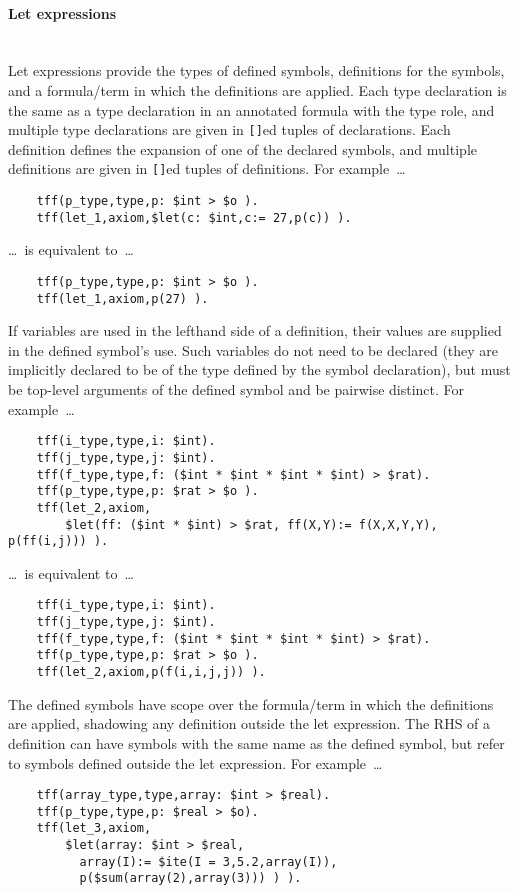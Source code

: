 \documentclass{easychair}
\begin{document}
\paragraph{Let expressions}~\\
Let expressions provide the types of defined symbols, definitions for the 
symbols, and a formula/term in which the definitions are applied. 
Each type declaration is the same as a type declaration in an annotated 
formula with the type role, and multiple type declarations are given in 
{\tt []}ed tuples of declarations. 
Each definition defines the expansion of one of the declared symbols, and 
multiple definitions are given in {\tt []}ed tuples of definitions. 
For example~\ldots
\begin{verbatim}
    tff(p_type,type,p: $int > $o ).
    tff(let_1,axiom,$let(c: $int,c:= 27,p(c)) ).
\end{verbatim}
\ldots~is equivalent to~\ldots
\begin{verbatim}
    tff(p_type,type,p: $int > $o ).
    tff(let_1,axiom,p(27) ).
\end{verbatim}
If variables are used in the lefthand side of a definition, their values are 
supplied in the defined symbol's use. 
Such variables do not need to be declared (they are implicitly declared to be 
of the type defined by the symbol declaration), but must be top-level arguments 
of the defined symbol and be pairwise distinct. 
For example~\ldots
\begin{verbatim}
    tff(i_type,type,i: $int).
    tff(j_type,type,j: $int).
    tff(f_type,type,f: ($int * $int * $int * $int) > $rat).
    tff(p_type,type,p: $rat > $o ).
    tff(let_2,axiom,
        $let(ff: ($int * $int) > $rat, ff(X,Y):= f(X,X,Y,Y), p(ff(i,j))) ).
\end{verbatim}
\ldots~is equivalent to~\ldots
\begin{verbatim}
    tff(i_type,type,i: $int).
    tff(j_type,type,j: $int).
    tff(f_type,type,f: ($int * $int * $int * $int) > $rat).
    tff(p_type,type,p: $rat > $o ).
    tff(let_2,axiom,p(f(i,i,j,j)) ).
\end{verbatim}
The defined symbols have scope over the formula/term in which the definitions 
are applied, shadowing any definition outside the let expression. 
The RHS of a definition can have symbols with the same name as the defined 
symbol, but refer to symbols defined outside the let expression. 
For example~\ldots
\begin{verbatim}
    tff(array_type,type,array: $int > $real).
    tff(p_type,type,p: $real > $o).
    tff(let_3,axiom,
        $let(array: $int > $real,
          array(I):= $ite(I = 3,5.2,array(I)),
          p($sum(array(2),array(3))) ) ).
\end{verbatim}
\end{document}
